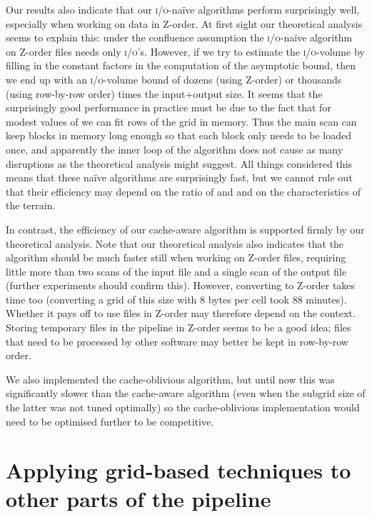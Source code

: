 \documentclass[10pt,a4paper]{article}
\def\io{\textsc{i/o}\xspace}
\def\ios{\textsc{i/o}'s\xspace}
\begin{document}
Our results also indicate that our \io-na\"ive algorithms perform surprisingly well, especially when working on data in Z-order. At first sight our theoretical analysis seems to explain this: under the confluence assumption the \io-na\"ive algorithm on Z-order files needs only  \ios. However, if we try to estimate the \io-volume by filling in the constant factors in the computation of the asymptotic bound, then we end up with an \io-volume bound of dozens (using Z-order) or thousands (using row-by-row order) times the input+output size. It seems that the surprisingly good performance in practice must be due to the fact that for modest values of  we can fit  rows of the grid in memory. Thus the main scan can keep blocks in memory long enough so that each block only needs to be loaded once, and apparently the inner loop of the algorithm does not cause as many disruptions as the theoretical analysis might suggest. All things considered this means that these na\"ive algorithms are surprisingly fast, but we cannot rule out that their efficiency may depend on the ratio of  and  and on the characteristics of the terrain.

In contrast, the efficiency of our cache-aware algorithm is supported firmly by our theoretical analysis. Note that our theoretical analysis also indicates that the algorithm should be much faster still when working on Z-order files, requiring little more than two scans of the input file and a single scan of the output file (further experiments should confirm this). However, converting to Z-order takes time too (converting a grid of this size with 8 bytes per cell took 88 minutes). Whether it pays off to use files in Z-order may therefore depend on the context. Storing temporary files in the pipeline in Z-order seems to be a good idea; files that need to be processed by other software may better be kept in row-by-row order.

We also implemented the cache-oblivious algorithm, but until now this was significantly slower than the cache-aware algorithm (even when the subgrid size of the latter was not tuned optimally) so the cache-oblivious implementation would need to be optimised further to be competitive.

\section{Applying grid-based techniques to other parts of the pipeline}
\label{sec:otherstages}
\end{document}
